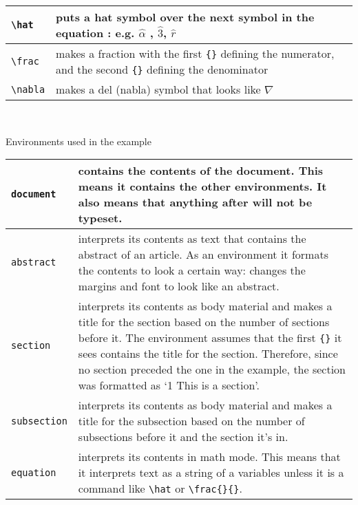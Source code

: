 \begin{center}
{\begin{tabular}{  | p{3.5cm } | p{11.5cm}|}
	\verb|\hat|								&  puts a hat symbol over the next symbol in the equation : e.g. $\hat \alpha$ , $\hat 3$, $\hat r$\\ \hline
	\verb|\frac|							&  makes a fraction with the first \texttt{\{\}} defining the numerator, and the second \texttt{\{\}} defining the denominator \\  \hline
	\verb|\nabla|							&  makes a del (nabla) symbol that looks like $\nabla$ \\ \hline
    \end{tabular}	}	
\end{center} 
\hfill \\ 

\newpage
\begin{center}
\begin{flushright}
{\large  \avantfont	 Environments used in the example}
\end{flushright}
    \begin{tabular}{  | p{2cm } | p{13cm}|}
     \hline \hline
\texttt{document} & contains the contents of the document. This means it contains the other environments. It also means that anything after \verb|| will not be typeset.\\ \hline
\texttt{abstract} & interprets its contents as text that contains the abstract of an article. As an environment it formats the contents to look a certain way: changes the margins and font to look like an abstract.\\ \hline
\texttt{section} & interprets its contents as body material and makes a title for the section based on the number of sections before it. The environment assumes that the first \texttt{\{\}} it sees contains the title for the section. Therefore, since no section preceded the one in the example, the section was formatted as `1 This is a section'.\\ \hline
\texttt{subsection}& interprets its contents as body material and makes a title for the subsection based on the number of subsections before it and the section it's in. \\ \hline
\texttt{equation} & interprets its contents in math mode. This means that it interprets text as a string of a variables unless it is a command like \verb|\hat| or \verb|\frac{}{}|.\\ \hline  
    \end{tabular}		
\end{center}

